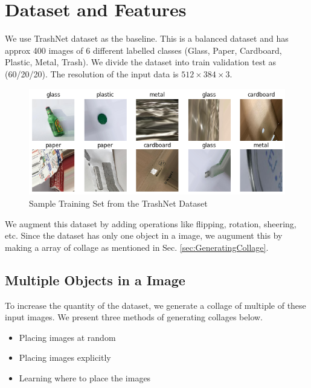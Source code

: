 \documentclass{article}
\begin{document}



\section{Dataset and Features}
We use TrashNet \citep{yang2016classification} dataset as the baseline. This is a balanced dataset and has approx 400 images of 6 different labelled classes (Glass, Paper, Cardboard, Plastic, Metal, Trash).  We divide the dataset into train \/ validation \/ test as (60/20/20). The resolution of the input data is $512 \times 384 \times 3$.

\begin{figure}[h!]
    \centering
    \includegraphics[width=0.8\linewidth]{data/images/03_Dataset/train_sample.png}
    \caption{Sample Training Set from the TrashNet Dataset \cite{yang2016classification}}
    \label{fig:TrainSample}
\end{figure}

We augment this dataset by adding operations like flipping, rotation, sheering, etc.  Since the dataset has only one object in a image, we augument this by making a array of collage as mentioned in Sec. \ref{sec:GeneratingCollage}. 


\subsection{Multiple Objects in a Image}
To increase the quantity of the dataset, we generate a collage of multiple of these input images. We present three methods of generating collages below. 
\begin{itemize}
    \item Placing images at random
    \item Placing images explicitly
    \item Learning where to place the images
\end{itemize}
\end{document}
